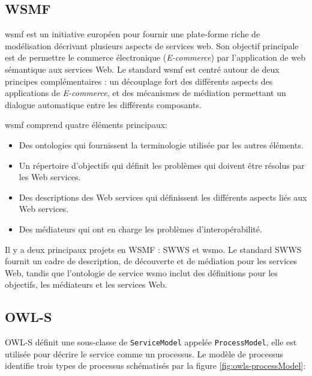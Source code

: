   \subsection{WSMF}
  \label{sec:wsmf}
  \acrshort{wsmf} \cite{fensel2002web} est un initiative européen pour
  fournir une plate-forme riche de modélisation décrivant plusieurs
  aspects de services web. Son objectif principale est de permettre le
  commerce électronique (\emph{E-commerce}) par l'application de web
  sémantique aux services Web.  Le standard \acrshort{wsmf} est centré
  autour de deux principes complémentaires \cite{baryannis2010}: un
  découplage fort des différents aspects des applications de
  \textit{E-commerce}, et des mécanismes de médiation permettant un
  dialogue automatique entre les différents composants.\medskip

  \acrshort{wsmf} comprend quatre éléments principaux:

  \SpecialItem
  \begin{itemize}
  \item Des ontologies qui fournissent la terminologie utilisée par
    les autres éléments.

  \item Un répertoire d'objectifs qui définit les problèmes qui
    doivent être résolus par les Web services.

  \item Des descriptions des Web services qui définissent les
    différents aspects liés aux Web services.

  \item Des médiateurs qui ont en charge les problèmes
    d'interopérabilité.
  \end{itemize}
  \enddescription

  Il y a deux principaux projets en WSMF : \textsc{SWWS} et
  \acrshort{wsmo}. Le standard \textsc{SWWS} fournit un cadre de
  description, de découverte et de médiation pour les services Web,
  tandis que l'ontologie de service \acrshort{wsmo} inclut des
  définitions pour les objectifs, les médiateurs et les services Web.

  \subsection{OWL-S}
  \label{sec:owl-s}

  

  \textsc{OWL-S} définit une sous-classe de \verb|ServiceModel|
  appelée \verb|ProcessModel|, elle est utilisée pour décrire le
  service comme un processus. Le modèle de processus identifie trois
  types de processus schématisés par la figure
  \ref{fig:owls-processModel}:


